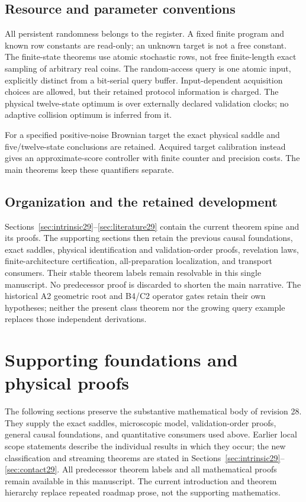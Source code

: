 \documentclass[11pt]{amsart}
\theoremstyle{definition}\newtheorem{definition}[theorem]{Definition}
\theoremstyle{remark}\newtheorem{remark}[theorem]{Remark}
\newcommand{\1}{\mathbf 1}
\begin{document}
\subsection{Resource and parameter conventions}
All persistent randomness belongs to the register. A fixed finite
program and known row constants are read-only; an unknown target is
not a free constant. The finite-state theorems use atomic stochastic
rows, not free finite-length exact sampling of arbitrary real coins.
The random-access query is one atomic input, explicitly distinct from
a bit-serial query buffer. Input-dependent acquisition choices are
allowed, but their retained protocol information is charged. The
physical twelve-state optimum is over externally declared validation
clocks; no adaptive collision optimum is inferred from it.

For a specified positive-noise Brownian target the exact physical saddle
and five/twelve-state conclusions are retained. Acquired target
calibration instead gives an approximate-score controller with finite
counter and precision costs. The main theorems keep these quantifiers
separate.

\subsection{Organization and the retained development}
Sections~\ref{sec:intrinsic29}--\ref{sec:literature29} contain the
current theorem spine and its proofs. The supporting sections then
retain the previous causal foundations, exact saddles, physical
identification and validation-order proofs, revelation laws,
finite-architecture certification, all-preparation localization, and
transport consumers. Their stable theorem labels remain resolvable in
this single manuscript. No predecessor proof is discarded to shorten
the main narrative. The historical A2 geometric root and B4/C2 operator
gates retain their own hypotheses; neither the present class theorem
nor the growing query example replaces those independent derivations.







\clearpage
\appendix
\renewcommand{\thesection}{A.\arabic{section}}
\section*{Supporting foundations and physical proofs}
\label{sec:retained29}
The following sections preserve the substantive mathematical body of
revision 28. They supply the exact saddles, microscopic model,
validation-order proofs, general causal foundations, and quantitative
consumers used above. Earlier local scope statements describe the
individual results in which they occur; the new classification and
streaming theorems are stated in Sections~\ref{sec:intrinsic29}--\ref{sec:contact29}.
All predecessor theorem labels and all mathematical proofs remain
available in this manuscript. The current introduction and theorem
hierarchy replace repeated roadmap prose, not the supporting mathematics.
\end{document}
